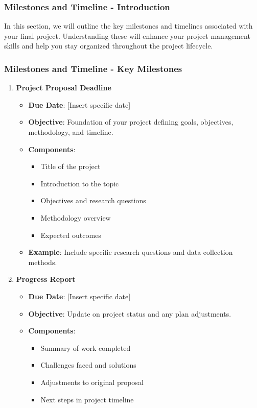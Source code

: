 \documentclass[aspectratio=169]{beamer}
\begin{document}
\begin{frame}[fragile]
  \frametitle{Milestones and Timeline - Introduction}
  In this section, we will outline the key milestones and timelines associated with your final project. Understanding these will enhance your project management skills and help you stay organized throughout the project lifecycle.
\end{frame}

\begin{frame}[fragile]
  \frametitle{Milestones and Timeline - Key Milestones}
  \begin{enumerate}
    \item \textbf{Project Proposal Deadline}
      \begin{itemize}
        \item \textbf{Due Date}: [Insert specific date]
        \item \textbf{Objective}: Foundation of your project defining goals, objectives, methodology, and timeline.
        \item \textbf{Components}:
          \begin{itemize}
            \item Title of the project
            \item Introduction to the topic
            \item Objectives and research questions
            \item Methodology overview
            \item Expected outcomes
          \end{itemize}
        \item \textbf{Example}: Include specific research questions and data collection methods.
      \end{itemize}

    \item \textbf{Progress Report}
      \begin{itemize}
        \item \textbf{Due Date}: [Insert specific date]
        \item \textbf{Objective}: Update on project status and any plan adjustments.
        \item \textbf{Components}:
          \begin{itemize}
            \item Summary of work completed
            \item Challenges faced and solutions
            \item Adjustments to original proposal
            \item Next steps in project timeline
          \end{itemize}
      \end{itemize}


\end{enumerate}
\end{frame}
\end{document}
